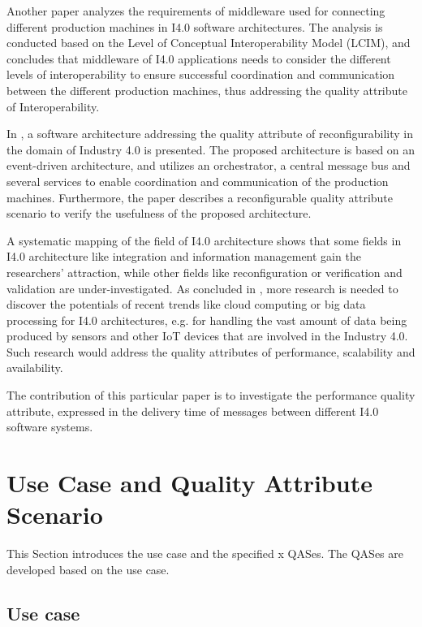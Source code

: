 \documentclass[conference]{IEEEtran}
\begin{document}
Another paper \cite{jepsen_industry_2021} analyzes the requirements of middleware used for connecting different production machines in I4.0 software architectures. The analysis is conducted based on the Level of Conceptual Interoperability Model (LCIM), and concludes that middleware of I4.0 applications needs to consider the different levels of interoperability to ensure successful coordination and communication between the different production machines, thus addressing the quality attribute of Interoperability.

In \cite{jepsen_reconfigurable_2023}, a software architecture addressing the quality attribute of reconfigurability in the domain of Industry 4.0 is presented. The proposed architecture is based on an event-driven architecture, and utilizes an orchestrator, a central message bus and several services to enable coordination and communication of the production machines. Furthermore, the paper describes a reconfigurable quality attribute scenario to verify the usefulness of the proposed architecture.

A systematic mapping of the field of I4.0 architecture \cite{hofer_architecture_2018} shows that some fields in I4.0 architecture like integration and information management gain the researchers' attraction, while other fields like reconfiguration or verification and validation are under-investigated. As concluded in \cite{pivoto_cyber-physical_2021}, more research is needed to discover the potentials of recent trends like cloud computing or big data processing for I4.0 architectures, e.g. for handling the vast amount of data being produced by sensors and other IoT devices that are involved in the Industry 4.0. Such research would address the quality attributes of performance, scalability and availability.

The contribution of this particular paper is to investigate the performance quality attribute, expressed in the delivery time of messages between different I4.0 software systems.

\newpage
\section{Use Case and Quality Attribute Scenario}
\label{sec:use_case_and_qas}
This Section introduces the use case and the specified x QASes.
The QASes are developed based on the use case.

\subsection{Use case}
\label{sec:use_case}
\end{document}
